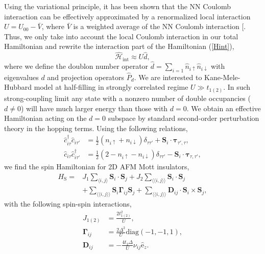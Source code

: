 \documentclass[aps,prl,twocolumn,amsmath,amssymb,nobibnotes]{revtex4-1}%
\renewcommand{\cite}[1]{{[}\onlinecite{#1}{]}}
\newcommand{\n}{\nonumber}
\newcommand{\bs}{\boldsymbol}
\begin{document}
Using the variational principle, it has been shown that the NN Coulomb interaction can be effectively approximated by a renormalized local interaction $U =U_{00} - \bar{V}$, where $\bar{V}$ is a weighted average of the NN Coulomb interaction \cite{Schuler2013,Stepanov2017}. Thus, we only take into account the local Coulomb interaction in our total Hamiltonian and rewrite the interaction part of the Hamiltonian (\ref{Hint}),
\begin{equation}
\hat{\mathcal{H}}_{\text{int}} \approx U\hat{d},
\end{equation}
where we define the doublon number operator $\hat{d} = \sum_{i=1} \hat{n}_{i\uparrow}\hat{n}_{i\downarrow}$ with eigenvalues $d$ and projection operators $\hat{P}_d$. We are interested to Kane-Mele-Hubbard model at half-filling in strongly correlated regime $U\gg t_{1(2)}$. In such strong-coupling limit any state with a nonzero number of double occupancies ($d \neq 0$) will have much larger energy than those with $d=0$. We obtain an effective Hamiltonian acting on the $d=0$ subspace by standard second-order perturbation theory in the hopping terms. Using the following relations,
\begin{align}
\hat{c}_{i \tau}^\dagger \hat{c}_{i \tau'} &= \frac{1}{2} (n_{i \uparrow} + n_{i \downarrow})\delta_{\tau \tau'}  + \bs{S}_i\cdot\bs{\tau}_{\tau', \tau}, \label{SpinOperatorInv1}\\
\hat{c}_{i \tau} \hat{c}_{i \tau'}^\dagger &= \frac{1}{2} (2 - n_{i \uparrow} - n_{i \downarrow}) \delta_{\tau \tau'} - \bs{S}_i\cdot\bs{\tau}_{\tau, \tau'}, \label{SpinOperatorInv2}
\end{align}
we find the spin Hamiltonian for 2D AFM Mott insulators,
\begin{align}
\label{MKMHeff0}
H_{\text{S}} =& J_{1}\sum_{\langle i,j \rangle} \bs{S}_i\cdot\bs{S}_j + J_{2}\sum_{\langle \langle i,j \rangle \rangle} \bs{S}_i\cdot\bs{S}_j\n \\
&+ \sum_{\langle \langle i,j \rangle \rangle} \bs{S}_i \bs{\Gamma}_{ij} \bs{S}_j +\sum_{\langle \langle i,j \rangle \rangle} \bs{D}_{ij}\cdot \bs{S}_i \times \bs{S}_j,
\end{align}
with the following spin-spin interactions,
\begin{align}
J_{1(2)} &= \frac{2t_{1(2)}^2}{U}, \\
\bs{\Gamma}_{ij} &=\frac{2\Delta^2}{U} \text{diag}(-1,-1,1),\\
\bs{D}_{ij} &= - \frac{4 t_2 \Delta}{U}\nu_{ij}  \hat{\mathrm{e}}_z.
\end{align}
\end{document}
